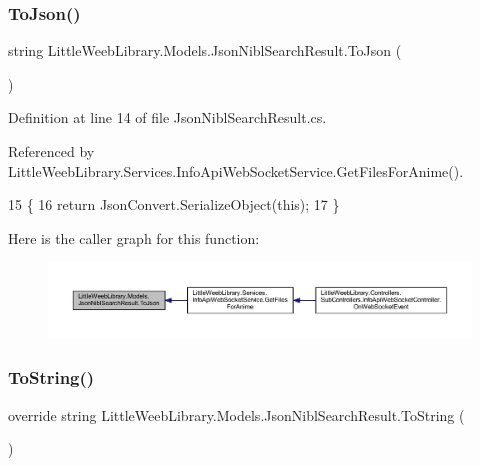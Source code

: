 \subsubsection{\texorpdfstring{To\+Json()}{ToJson()}}
{\footnotesize\ttfamily string Little\+Weeb\+Library.\+Models.\+Json\+Nibl\+Search\+Result.\+To\+Json (\begin{DoxyParamCaption}{ }\end{DoxyParamCaption})}



Definition at line 14 of file Json\+Nibl\+Search\+Result.\+cs.



Referenced by Little\+Weeb\+Library.\+Services.\+Info\+Api\+Web\+Socket\+Service.\+Get\+Files\+For\+Anime().


\begin{DoxyCode}
15         \{
16             \textcolor{keywordflow}{return} JsonConvert.SerializeObject(\textcolor{keyword}{this});
17         \}
\end{DoxyCode}
Here is the caller graph for this function\+:\nopagebreak
\begin{figure}[H]
\begin{center}
\leavevmode
\includegraphics[width=350pt]{class_little_weeb_library_1_1_models_1_1_json_nibl_search_result_a0d6ce8593661ae3dab31882c85b1cff7_icgraph}
\end{center}
\end{figure}
\mbox{\label{class_little_weeb_library_1_1_models_1_1_json_nibl_search_result_ad0ccabee81ba5885580d9516f4db4099}} 
\subsubsection{\texorpdfstring{To\+String()}{ToString()}}
{\footnotesize\ttfamily override string Little\+Weeb\+Library.\+Models.\+Json\+Nibl\+Search\+Result.\+To\+String (\begin{DoxyParamCaption}{ }\end{DoxyParamCaption})}



